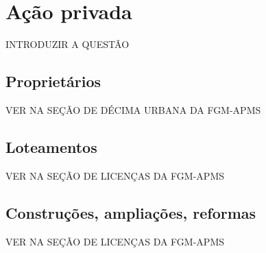 \section{Ação privada}\label{sec:3.2}

INTRODUZIR A QUESTÃO

\subsection{Proprietários}\label{subsec:3.2.1}

VER NA SEÇÃO DE DÉCIMA URBANA DA FGM-APMS

\subsection{Loteamentos}\label{subsec:3.2.2}

VER NA SEÇÃO DE LICENÇAS DA FGM-APMS

\subsection{Construções, ampliações, reformas}\label{subsec:3.2.3}

VER NA SEÇÃO DE LICENÇAS DA FGM-APMS